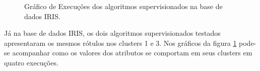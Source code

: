 \begin{figure}[h!]
    \centering
    \quad
    
    \caption{Gráfico de Execuções dos algoritmos supervisionados na base de dados IRIS.} \label{fig:graf:IRIS_NB_CART}
        
\end{figure}

Já na base de dados IRIS, os dois algoritmos supervisionados testados apresentaram os mesmos rótulos nos clusters 1 e 3. Nos gráficos da figura \ref{fig:graf:IRIS_NB_CART} pode-se acompanhar como os valores dos atributos se comportam em seus clusters em quatro execuções. 

